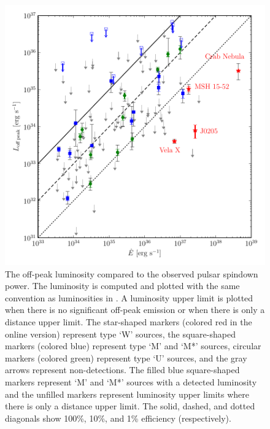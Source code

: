 \begin{figure}
  \includegraphics{chapters/offpeak/figures/off_peak_luminosity_vs_edot_color.pdf}
  \caption{The off-peak luminosity compared to the observed pulsar
  spindown power.  The luminosity is computed and plotted with the
  same convention as luminosities in \cite{abdo_2013a_second-fermi}.
  A luminosity upper limit is plotted when there is no significant
  off-peak emission or when there is only a distance upper limit.  The
  star-shaped markers (colored red in the online version) represent type
  `W' sources, the square-shaped markers (colored blue) represent type `M'
  and `M*' sources, circular markers (colored green) represent type `U'
  sources, and the gray arrows represent non-detections.  The filled blue
  square-shaped markers represent `M' and `M*' sources with a detected
  luminosity and the unfilled markers represent luminosity upper limits
  where there is only a distance upper limit.  The solid, dashed, and
  dotted diagonals show 100\%, 10\%, and 1\% efficiency (respectively).}
\end{figure}
